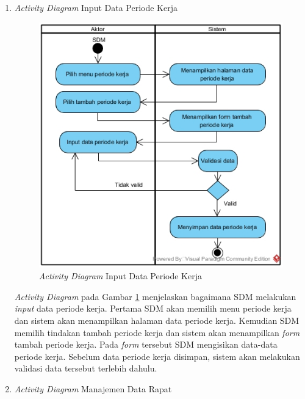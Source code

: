 \begin{enumerate}
            	\item \emph{Activity Diagram} Input Data Periode Kerja
            	    \begin{figure}[H]
            		    \centering
            		    \includegraphics[width=13cm]{gambar/activity/input-data-periode-kerja}
            		    \caption{\emph{Activity Diagram} Input Data Periode Kerja}
            		    \label{activity_periode_kerja}
            		\end{figure}
            		\emph{Activity Diagram} pada Gambar \ref{activity_periode_kerja} menjelaskan bagaimana SDM melakukan \emph{input} data periode kerja. Pertama SDM akan memilih menu periode kerja dan sistem akan menampilkan halaman data periode kerja. Kemudian SDM memilih tindakan tambah periode kerja dan sistem akan menampilkan \emph{form} tambah periode kerja. Pada \emph{form} tersebut SDM mengisikan data-data periode kerja. Sebelum data periode kerja disimpan, sistem akan melakukan validasi data tersebut terlebih dahulu. \newpage
            	\item \emph{Activity Diagram} Manajemen Data Rapat
            	

\end{enumerate}
